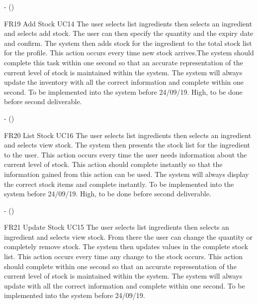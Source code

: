 \noindent \textbf{} -  ()\\
\begin{small}
	
\end{small}
\linebreak

FR19
Add Stock
UC14
The user selects list ingredients then selects an ingredient and selects add stock. The user can then specify the quantity and the expiry date and confirm. The system then adds stock for the ingredient to the total stock list for the profile. This action occurs every time new stock arrives.The system should complete this task within one second so that an accurate representation of the current level of stock is maintained within the system. The system will always update the inventory with all the correct information and complete within one second. To be implemented into the system before 24/09/19.
High, to be done before second deliverable.

\noindent \textbf{} -  ()\\
\begin{small}
	
\end{small}
\linebreak

FR20
List Stock
UC16
The user selects list ingredients then selects an ingredient and selects view stock. The system then presents the stock list for the ingredient to the user. This action occurs every time the user needs information about the current level of stock. This action should complete instantly so that the information gained from this action can be used. The system will always display the correct stock items and complete instantly. To be implemented into the system before 24/09/19. 
High, to be done before second deliverable.

\noindent \textbf{} -  ()\\
\begin{small}
	
\end{small}
\linebreak

FR21
Update Stock
UC15
The user selects list ingredients then selects an ingredient and selects view stock. From there the user can change the quantity or completely remove stock. The system then updates values in the complete stock list. This action occurs every time any change to the stock occurs. This action should complete within one second so that an accurate representation of the current level of stock is maintained within the system. The system will always update with all the correct information and complete within one second. To be implemented into the system before 24/09/19. 

